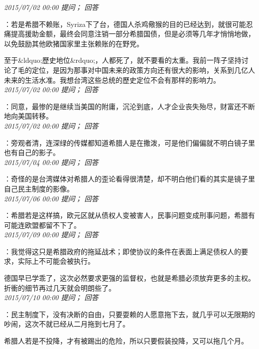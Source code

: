 \documentclass[twocolumn]{ctexart}
\begin{document}
\textit{\hfill\noindent\small 2015/07/02 00:00 提问； 回答}

：若是希腊不赖账，Syriza下了台，德国人杀鸡儆猴的目的已经达到，就很可能忍痛提高援助金额，最终会同意注销一部分希腊国债，但是必须等几年才悄悄地做，以免鼓励其他欧猪国家里主张赖账的在野党。

至于\&ldquo;歷史地位\&rdquo;，人都死了，就不要看的太重。我前一阵子坚持讨论了毛的定位，是因为那事对中国未来的政策方向还有很大的影响，关系到几亿人未来的生活水准。我想台湾这些总统的歷史定位不会有那样的影响力。\\

\textit{\hfill\noindent\small 2015/07/02 00:00 提问； 回答}

：同意，最惨的是继续当美国的附庸，沉沦到底，人才企业丧失殆尽，财富还不断地向美国转移。\\

\textit{\hfill\noindent\small 2015/07/02 00:00 提问； 回答}

：旁观者清，连深绿的传媒都知道希腊人是在撒泼，可是他们偏偏就不明白镜子里也有自己的影子。\\

\textit{\hfill\noindent\small 2015/07/04 00:00 提问； 回答}

：奇怪的是台湾媒体对希腊人的歪论看得很清楚，却不明白他们看的其实是镜子里自己民主制度的影像。\\

\textit{\hfill\noindent\small 2015/07/06 00:00 提问； 回答}

：希腊若是这样搞，欧元区就从债权人变被害人，民事问题变成刑事问题，希腊有可能连欧盟都留不下了。\\

\textit{\hfill\noindent\small 2015/07/09 00:00 提问； 回答}

：我觉得这只是希腊政府的拖延战术；即使协议的条件在表面上满足债权人的要求，实际上不可能会被执行。

德国早已学乖了，这次必然要求更强的监督权，也就是希腊必须放弃更多的主权。折衝的细节再过几天就会明朗些了。\\

\textit{\hfill\noindent\small 2015/07/10 00:00 提问； 回答}

：民主制度下，没有决断的自由，只要耍赖的人愿意拖下去，就几乎可以无限期的吵闹，这次不就已经从二月拖到七月了。

希腊人若是不投降，才有被踢出的危险，所以只要假装投降，又可以拖几个月。\\
\end{document}
